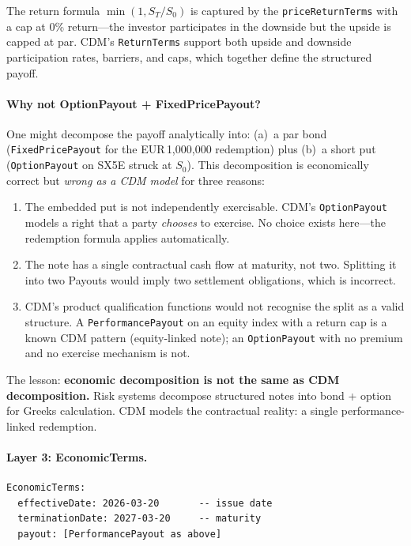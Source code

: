 \documentclass[11pt,a4paper]{article}
\begin{document}
\noindent The return formula $\min(1, S_T/S_0)$ is captured by the \texttt{priceReturnTerms} with a cap at 0\% return---the investor participates in the downside but the upside is capped at par. CDM's \texttt{ReturnTerms} support both upside and downside participation rates, barriers, and caps, which together define the structured payoff.

\paragraph{Why not OptionPayout + FixedPricePayout?}

One might decompose the payoff analytically into: (a)~a par bond (\texttt{FixedPricePayout} for the EUR\,1,000,000 redemption) plus (b)~a short put (\texttt{OptionPayout} on SX5E struck at $S_0$). This decomposition is economically correct but \emph{wrong as a CDM model} for three reasons:

\begin{enumerate}[nosep]
\item The embedded put is not independently exercisable. CDM's \texttt{OptionPayout} models a right that a party \emph{chooses} to exercise. No choice exists here---the redemption formula applies automatically.
\item The note has a single contractual cash flow at maturity, not two. Splitting it into two Payouts would imply two settlement obligations, which is incorrect.
\item CDM's product qualification functions would not recognise the split as a valid structure. A \texttt{PerformancePayout} on an equity index with a return cap is a known CDM pattern (equity-linked note); an \texttt{OptionPayout} with no premium and no exercise mechanism is not.
\end{enumerate}

\noindent The lesson: \textbf{economic decomposition is not the same as CDM decomposition.} Risk systems decompose structured notes into bond + option for Greeks calculation. CDM models the contractual reality: a single performance-linked redemption.

\paragraph{Layer 3: EconomicTerms.}

\begin{lstlisting}
EconomicTerms:
  effectiveDate: 2026-03-20       -- issue date
  terminationDate: 2027-03-20     -- maturity
  payout: [PerformancePayout as above]
\end{lstlisting}
\end{document}
